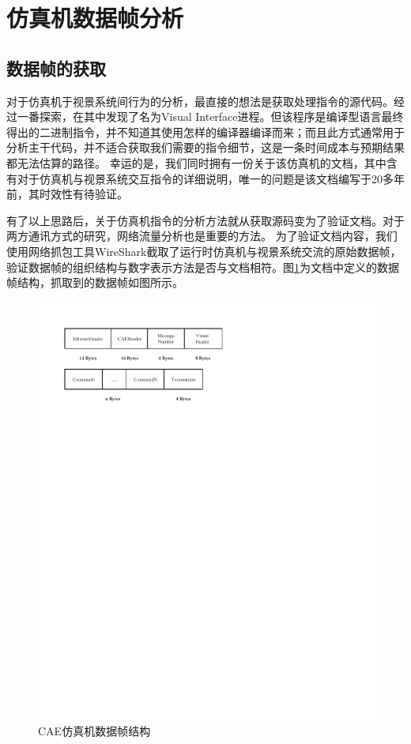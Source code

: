\section{仿真机数据帧分析}
\subsection{数据帧的获取}
对于仿真机于视景系统间行为的分析，最直接的想法是获取处理指令的源代码。经过一番探索，在其中发现了名为Visual Interface进程。但该程序是编译型语言最终得出的二进制指令，并不知道其使用怎样的编译器编译而来；而且此方式通常用于分析主干代码，并不适合获取我们需要的指令细节，这是一条时间成本与预期结果都无法估算的路径。
幸运的是，我们同时拥有一份关于该仿真机的文档，其中含有对于仿真机与视景系统交互指令的详细说明，唯一的问题是该文档编写于20多年前，其时效性有待验证。
\par
有了以上思路后，关于仿真机指令的分析方法就从获取源码变为了验证文档。对于两方通讯方式的研究，网络流量分析也是重要的方法。
为了验证文档内容，我们使用网络抓包工具WireShark截取了运行时仿真机与视景系统交流的原始数据帧，验证数据帧的组织结构与数字表示方法是否与文档相符。图\ref{datastruct}为文档中定义的数据帧结构，抓取到的数据帧如图所示。
\begin{figure}[h!]
    \begin{center}
        \includegraphics[width=.8\textwidth]{pictures/datastruct.pdf}
        \caption{CAE仿真机数据帧结构}
        \label{datastruct}
    \end{center}
\end{figure}
